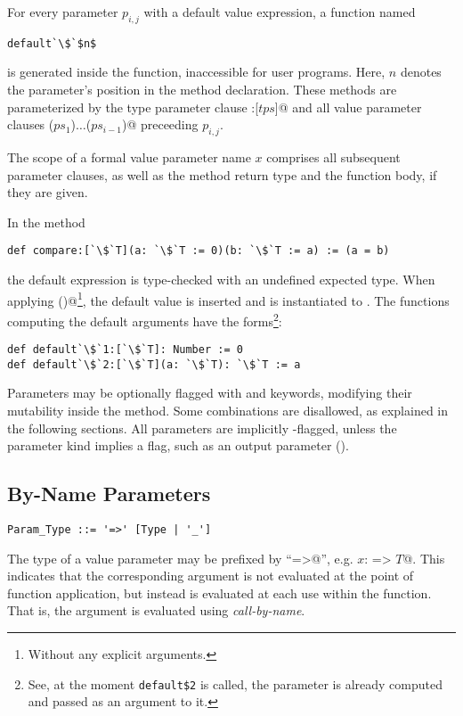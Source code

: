 For every parameter $p_{i,j}$ with a default value expression, a function named 
\begin{lstlisting}[escapechar=`]
default`\$`$n$
\end{lstlisting}
is generated inside the function, inaccessible for user programs. Here, $n$ denotes the parameter's position in the method declaration. These methods are parameterized by the type parameter clause \lstinline@:[$tps$]@ and all value parameter clauses \lstinline@($ps_1$)$\ldots$($ps_{i-1}$)@ preceeding $p_{i,j}$.

The scope of a formal value parameter name $x$ comprises all subsequent parameter clauses, as well as the method return type and the function body, if they are given.

\example In the method
\begin{lstlisting}[escapechar=`]
def compare:[`\$`T](a: `\$`T := 0)(b: `\$`T := a) := (a = b)
\end{lstlisting}
the default expression  is type-checked with an undefined expected type. When applying \lstinline@compare()@\footnote{Without any explicit arguments.}, the default value  is inserted and  is instantiated to . The functions computing the default arguments have the forms\footnote{See, at the moment \lstinline[mathescape=false]!default$2! is called, the parameter  is already computed and passed as an argument to it.}:
\begin{lstlisting}[escapechar=`]
def default`\$`1:[`\$`T]: Number := 0
def default`\$`2:[`\$`T](a: `\$`T): `\$`T := a
\end{lstlisting}

Parameters may be optionally flagged with  and  keywords, modifying their mutability inside the method. Some combinations are disallowed, as explained in the following sections. All parameters are implicitly -flagged, unless the parameter kind implies a  flag, such as an output parameter ().

\subsection{By-Name Parameters}
\label{sec:by-name-parameters}

\syntax\begin{lstlisting}
Param_Type ::= '=>' [Type | '_']
\end{lstlisting}

The type of a value parameter may be prefixed by ``\lstinline@=>@'', e.g. \lstinline@$x$: => $T$@. This indicates that the corresponding argument is not evaluated at the point of function application, but instead is evaluated at each use within the function. That is, the argument is evaluated using {\em call-by-name}. 

